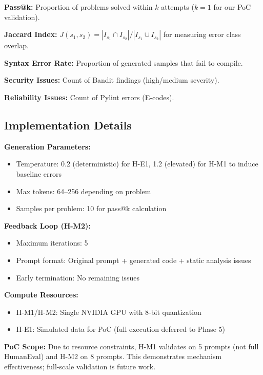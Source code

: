 \textbf{Pass@k:} Proportion of problems solved within $k$ attempts ($k=1$ for our PoC validation).

\textbf{Jaccard Index:} $J(s_1, s_2) = |I_{s_1} \cap I_{s_2}| / |I_{s_1} \cup I_{s_2}|$ for measuring error class overlap.

\textbf{Syntax Error Rate:} Proportion of generated samples that fail to compile.

\textbf{Security Issues:} Count of Bandit findings (high/medium severity).

\textbf{Reliability Issues:} Count of Pylint errors (E-codes).

\subsection{Implementation Details}

\textbf{Generation Parameters:}
\begin{itemize}
    \item Temperature: 0.2 (deterministic) for H-E1, 1.2 (elevated) for H-M1 to induce baseline errors
    \item Max tokens: 64--256 depending on problem
    \item Samples per problem: 10 for pass@k calculation
\end{itemize}

\textbf{Feedback Loop (H-M2):}
\begin{itemize}
    \item Maximum iterations: 5
    \item Prompt format: Original prompt + generated code + static analysis issues
    \item Early termination: No remaining issues
\end{itemize}

\textbf{Compute Resources:}
\begin{itemize}
    \item H-M1/H-M2: Single NVIDIA GPU with 8-bit quantization
    \item H-E1: Simulated data for PoC (full execution deferred to Phase 5)
\end{itemize}

\textbf{PoC Scope:} Due to resource constraints, H-M1 validates on 5 prompts (not full HumanEval) and H-M2 on 8 prompts. This demonstrates mechanism effectiveness; full-scale validation is future work.
